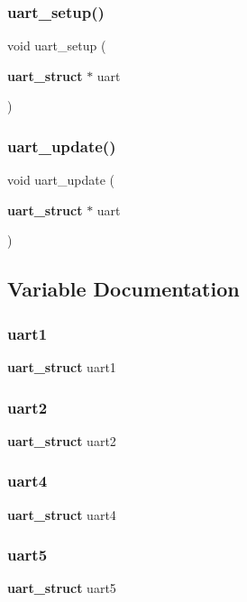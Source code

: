 \mbox{\label{uart_8h_a405c48b160a7d3acd62fffd1689c4565}} 
\subsubsection{uart\+\_\+setup()}
{\footnotesize\ttfamily void uart\+\_\+setup (\begin{DoxyParamCaption}\item[{\textbf{ uart\+\_\+struct} $\ast$}]{uart }\end{DoxyParamCaption})}

\mbox{\label{uart_8h_a68a0ecd6fa6c38259233f56ca5d8d534}} 
\subsubsection{uart\+\_\+update()}
{\footnotesize\ttfamily void uart\+\_\+update (\begin{DoxyParamCaption}\item[{\textbf{ uart\+\_\+struct} $\ast$}]{uart }\end{DoxyParamCaption})}



\subsection{Variable Documentation}
\mbox{\label{uart_8h_a1cc6e1f991633f4d528ee8a979685b30}} 
\subsubsection{uart1}
{\footnotesize\ttfamily \textbf{ uart\+\_\+struct} uart1}

\mbox{\label{uart_8h_a642e8d51aa7bf1cab6f72203a933c9ee}} 
\subsubsection{uart2}
{\footnotesize\ttfamily \textbf{ uart\+\_\+struct} uart2}

\mbox{\label{uart_8h_aa8e203dc18f4b405481f2e679e7d0cc2}} 
\subsubsection{uart4}
{\footnotesize\ttfamily \textbf{ uart\+\_\+struct} uart4}

\mbox{\label{uart_8h_aa3f68d3c667bb4b02c177524561a69ed}} 
\subsubsection{uart5}
{\footnotesize\ttfamily \textbf{ uart\+\_\+struct} uart5}


